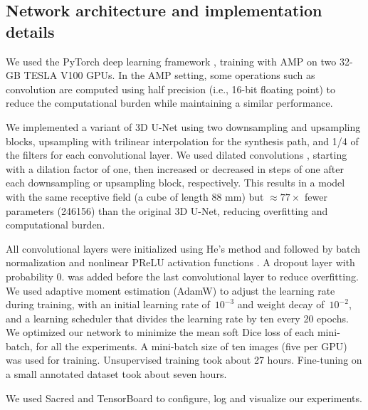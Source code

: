 \subsection{Network architecture and implementation details}

We used the PyTorch deep learning framework \cite{paszke_pytorch_2019}, training with \ac{AMP} on two 32-GB TESLA V100 GPUs.
In the \ac{AMP} setting, some operations such as convolution are computed using half precision (i.e., 16-bit floating point) to reduce the computational burden while maintaining a similar performance.

We implemented a variant of 3D U-Net \cite{cicek_3d_2016} using two downsampling and upsampling blocks, upsampling with trilinear interpolation for the synthesis path, and 1/4 of the filters for each convolutional layer.
We used dilated convolutions \cite{chen_deeplab_2017}, starting with a dilation factor of one, then increased or decreased in steps of one after each downsampling or upsampling block, respectively.
This results in a model with the same receptive field (a cube of length 88 mm) but $\approx 77 \times$ fewer parameters (\num{246156}) than the original 3D U-Net, reducing overfitting and computational burden.

All convolutional layers were initialized using He's method and followed by batch normalization and nonlinear PReLU activation functions \cite{ioffe_batch_2015,he_delving_2015}.
A dropout layer with probability 0. \cite{srivastava_dropout_2014} was added before the last convolutional layer to reduce overfitting.
We used adaptive moment estimation (AdamW) \cite{kingma_adam_2014,loshchilov_decoupled_2019} to adjust the learning rate during training, with an initial learning rate of~$10^{-3}$ and weight decay of~$10^{-2}$,
and a learning scheduler that divides the learning rate by ten every 20 epochs.
We optimized our network to minimize the mean soft Dice loss \cite{milletari_v-net_2016} of each mini-batch, for all the experiments.
A mini-batch size of ten images (five per GPU) was used for training.
Unsupervised training took about 27 hours.
Fine-tuning on a small annotated dataset took about seven hours.

We used Sacred \cite{greff_sacred_2017} and TensorBoard \cite{abadi_tensorflow_2016} to configure, log and visualize our experiments.
